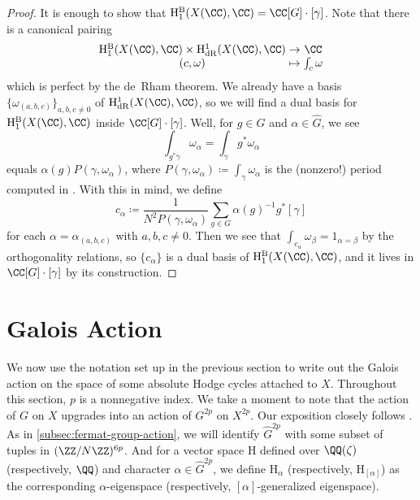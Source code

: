 \documentclass[../thesis.tex]{subfiles}
\begin{document}
\begin{proof}
	It is enough to show that $\mathrm H_1^{\mathrm B}(X(\CC),\CC)=\CC[G]\cdot[\gamma]$. Note that there is a canonical pairing
	\[\arraycolsep=1.4pt\begin{array}{ccc}
		\mathrm H_1^{\mathrm B}(X(\CC),\CC) \times \mathrm H^1_{\mathrm{dR}}(X(\CC),\CC) &\to& \CC \\
		(c,\omega) &\mapsto& \int_c\omega
	\end{array}\]
	which is perfect by the de~Rham theorem. We already have a basis $\{\omega_{(a,b,c)}\}_{a,b,c\ne0}$ of $\mathrm H^1_{\mathrm{dR}}(X(\CC),\CC)$, so we will find a dual basis for $\mathrm H_1^{\mathrm B}(X(\CC),\CC)$ inside $\CC[G]\cdot[\gamma]$. Well, for $g\in G$ and $\alpha\in\widehat G$, we see
	\[\int_{g^*\gamma}\omega_\alpha=\int_{\gamma}g^*\omega_\alpha\]
	equals $\alpha(g)P(\gamma,\omega_\alpha)$, where $P(\gamma,\omega_\alpha)\coloneqq\int_\gamma\omega_\alpha$ is the (nonzero!) period computed in . With this in mind, we define
	\[c_\alpha\coloneqq\frac1{N^2P(\gamma,\omega_\alpha)}\sum_{g\in G}\alpha(g)^{-1}g^*[\gamma]\]
	for each $\alpha=\alpha_{(a,b,c)}$ with $a,b,c\ne0$. Then we see that $\int_{c_\alpha}\omega_\beta=1_{\alpha=\beta}$ by the orthogonality relations, so $\{c_\alpha\}$ is a dual basis of $\mathrm H_1^{\mathrm B}(X(\CC),\CC)$, and it lives in $\CC[G]\cdot[\gamma]$ by its construction.
\end{proof}

\section{Galois Action}
We now use the notation set up in the previous section to write out the Galois action on the space of some absolute Hodge cycles attached to $X$. Throughout this section, $p$ is a nonnegative index. We take a moment to note that the action of $G$ on $X$ upgrades into an action of $G^{2p}$ on $X^{2p}$. Our exposition closely follows \cite[Subsection~8.5]{ggl-fermat}. As in \cref{subsec:fermat-group-action}, we will identify $\widehat G^{2p}$ with some subset of tuples in $(\ZZ/N\ZZ)^{6p}$. And for a vector space $\mathrm H$ defined over $\QQ(\zeta)$ (respectively, $\QQ$) and character $\alpha\in\widehat G^{2p}$, we define $\mathrm H_\alpha$ (respectively, $\mathrm H_{[\alpha]}$) as the corresponding $\alpha$-eigenspace (respectively, $[\alpha]$-generalized eigenspace).
\end{document}

